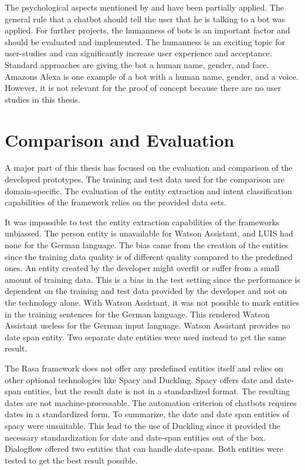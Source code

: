 The psychological aspects mentioned by \citet{folstad2017chatbots, brandtzaeg2018chatbots} and \citet{GO2019304} have been partially applied.
The general rule that a chatbot should tell the user that he is talking to a bot was applied.
For further projects, the humanness of bots is an important factor and should be evaluated and implemented.
The humanness is an exciting topic for user-studies and can significantly increase user experience and acceptance.
Standard approaches are giving the bot a human name, gender, and face.
Amazons Alexa is one example of a bot with a human name, gender, and a voice.
However, it is not relevant for the proof of concept because there are no user studies in this thesis.


\section{Comparison and Evaluation}\label{sec:comparison_and_eval}
A major part of this thesis has focused on the evaluation and comparison of the developed prototypes.
The training and test data used for the comparison are domain-specific. 
The evaluation of the entity extraction and intent classification capabilities of the framework relies on the provided data sets.

It was impossible to test the entity extraction capabilities of the frameworks unbiassed.
The person entity is unavailable for Watson Assistant, and LUIS had none for the German language.
The bias came from the creation of the entities since the training data quality is of different quality compared to the predefined ones.
An entity created by the developer might overfit or suffer from a small amount of training data.
This is a bias in the test setting since the performance is dependent on the training and test data provided by the developer and not on the technology alone.
With Watson Assistant, it was not possible to mark entities in the training sentences for the German language.
This rendered Watson Assistant useless for the German input language.
Watson Assistant provides no date span entity.
Two separate date entities were used instead to get the same result.
  
The Rasa framework does not offer any predefined entities itself and relies on other optional technologies like Spacy and Duckling.
Spacy offers date and date-span entities, but the result date is not in a standardized format.
The resulting dates are not machine-processable.
The automation criterion of chatbots requires dates in a standardized form.
To summarize, the date and date span entities of spacy were unsuitable.
This lead to the use of Duckling since it provided the necessary standardization for date and date-span entities out of the box.
Dialogflow offered two entities that can handle date-spans.
Both entities were tested to get the best result possible. 

